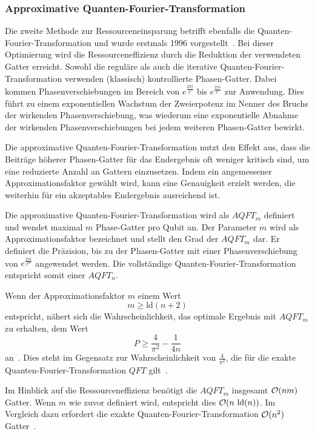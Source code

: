 \subsubsection{Approximative Quanten-Fourier-Transformation}
Die zweite Methode zur Ressourceneinsparung betrifft ebenfalls die Quanten-Fourier-Transformation und 
wurde erstmals 1996 vorgestellt~\cite{Barenco_1996}.
Bei dieser Optimierung wird die Ressourceneffizienz durch die Reduktion der verwendeten Gatter erreicht. 
Sowohl die reguläre als auch die iterative Quanten-Fourier-Transformation verwenden (klassisch) kontrollierte Phasen-Gatter.
Dabei kommen Phasenverschiebungen im Bereich von \(e^{\frac{2\pi i}{2^1}}\) bis \(e^{\frac{2\pi i}{2^n}}\) zur Anwendung. 
Dies führt zu einem exponentiellen Wachstum der Zweierpotenz im Nenner des Bruchs der wirkenden Phasenverschiebung, 
was wiederum eine exponentielle Abnahme der wirkenden Phasenverschiebungen bei jedem weiteren Phasen-Gatter bewirkt. 

Die approximative Quanten-Fourier-Transformation nutzt den Effekt aus, 
dass die Beiträge höherer Phasen-Gatter für das Endergebnis oft weniger kritisch sind, 
um eine reduzierte Anzahl an Gattern einzusetzen. 
Indem ein angemessener Approximationsfaktor gewählt wird, 
kann eine Genauigkeit erzielt werden, 
die weiterhin für ein akzeptables Endergebnis ausreichend ist.

Die approximative Quanten-Fourier-Transformation wird als \(AQFT_m\) definiert und 
wendet maximal \(m\) Phase-Gatter pro Qubit an. 
Der Parameter \(m\) wird als Approximationsfaktor bezeichnet und stellt den Grad der \(AQFT_m\) dar.  
Er definiert die Präzision, 
bis zu der Phasen-Gatter mit einer Phasenverschiebung von \(e^{\frac{2\pi i}{2^m}}\) angewendet werden.
Die vollständige Quanten-Fourier-Transformation entspricht somit einer \(AQFT_n\).

Wenn der Approximationsfaktor \(m\) einem Wert
\[m \geq \text{ld}(n+2)\]
entspricht, nähert sich die Wahrscheinlichkeit, das optimale Ergebnis mit \(AQFT_m\)
zu erhalten, dem Wert 
\[P \geq \frac{4}{\pi^2} - \frac{1}{4n}\]
an~\cite{cheung2004improved}.
Dies steht im Gegensatz zur Wahrscheinlichkeit von \(\frac{4}{\pi^2}\), 
die für die exakte Quanten-Fourier-Transformation \(QFT\) gilt~\cite{cheung2004improved}\cite[119]{kaye2007introduction}.

Im Hinblick auf die Ressourceneffizienz benötigt die \(AQFT_m\) insgesamt \(\operatorname{\mathcal{O}}(nm)\) Gatter.
Wenn \(m\) wie zuvor definiert wird, entspricht dies \(\operatorname{\mathcal{O}}(n~\text{ld}(n))\). 
Im Vergleich dazu erfordert die exakte Quanten-Fourier-Transformation \(\operatorname{\mathcal{O}}(n^2)\) Gatter~\cite{Barenco_1996}.

